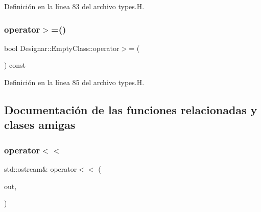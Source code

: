 Definición en la línea 83 del archivo types.\+H.

\mbox{\label{class_designar_1_1_empty_class_a84209f056d1930a130d55e8a6de090d2}} 
\subsubsection{\texorpdfstring{operator$>$=()}{operator>=()}}
{\footnotesize\ttfamily bool Designar\+::\+Empty\+Class\+::operator$>$= (\begin{DoxyParamCaption}\item[{const \hyperlink{class_designar_1_1_empty_class}{Empty\+Class} \&}]{ }\end{DoxyParamCaption}) const\hspace{0.3cm}{\ttfamily [inline]}}



Definición en la línea 85 del archivo types.\+H.



\subsection{Documentación de las funciones relacionadas y clases amigas}
\mbox{\label{class_designar_1_1_empty_class_a1927797e0167a693cd74b5227218f196}} 
\subsubsection{\texorpdfstring{operator$<$$<$}{operator<<}}
{\footnotesize\ttfamily std\+::ostream\& operator$<$$<$ (\begin{DoxyParamCaption}\item[{std\+::ostream \&}]{out,  }\item[{const \hyperlink{class_designar_1_1_empty_class}{Empty\+Class} \&}]{ }\end{DoxyParamCaption})\hspace{0.3cm}{\ttfamily [friend]}}



